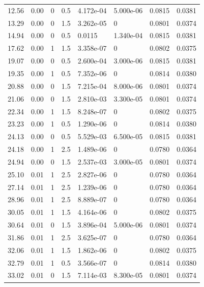 \documentclass[preview]{standalone}
\begin{document}
{{\begin{tabular}{L{1.2cm}C{1.2cm} C{0.3cm}C{0.5cm} C{1.4cm}C{1.4cm} C{1.4cm}C{1.4cm}}
  12.56  &  0.00  & 0     & 0.5 &  4.172e-04  & 5.000e-06  & 0.0815 &  0.0381   \\ 
  13.29  &  0.00  & 0     & 1.5 &  3.262e-05  & 0  & 0.0801 &  0.0374   \\ 
  14.94  &  0.00  & 0     & 0.5 &  0.0115  & 1.340e-04  & 0.0815 &  0.0381   \\ 
  17.62  &  0.00  & 1     & 1.5 &  3.358e-07  & 0  & 0.0802 &  0.0375   \\ 
  19.07  &  0.00  & 0     & 0.5 &  2.600e-04  & 3.000e-06  & 0.0815 &  0.0381   \\ 
  19.35  &  0.00  & 1     & 0.5 &  7.352e-06  & 0  & 0.0814 &  0.0380   \\ 
  20.88  &  0.00  & 0     & 1.5 &  7.215e-04  & 8.000e-06  & 0.0801 &  0.0374   \\ 
  21.06  &  0.00  & 0     & 1.5 &  2.810e-03  & 3.300e-05  & 0.0801 &  0.0374   \\ 
  22.34  &  0.00  & 1     & 1.5 &  8.248e-07  & 0  & 0.0802 &  0.0375   \\ 
  23.23  &  0.00  & 1     & 0.5 &  1.290e-06  & 0  & 0.0814 &  0.0380   \\ 
  24.13  &  0.00  & 0     & 0.5 &  5.529e-03  & 6.500e-05  & 0.0815 &  0.0381   \\ 
  24.18  &  0.00  & 1     & 2.5 &  1.489e-06  & 0  & 0.0780 &  0.0364   \\ 
  24.94  &  0.00  & 0     & 1.5 &  2.537e-03  & 3.000e-05  & 0.0801 &  0.0374   \\ 
  25.10  &  0.01  & 1     & 2.5 &  2.827e-06  & 0  & 0.0780 &  0.0364   \\ 
  27.14  &  0.01  & 1     & 2.5 &  1.239e-06  & 0  & 0.0780 &  0.0364   \\ 
  28.96  &  0.01  & 1     & 2.5 &  8.889e-07  & 0  & 0.0780 &  0.0364   \\ 
  30.05  &  0.01  & 1     & 1.5 &  4.164e-06  & 0  & 0.0802 &  0.0375   \\ 
  30.64  &  0.01  & 0     & 1.5 &  3.896e-04  & 5.000e-06  & 0.0801 &  0.0374   \\ 
  31.86  &  0.01  & 1     & 2.5 &  3.625e-07  & 0  & 0.0780 &  0.0364   \\ 
  32.06  &  0.01  & 1     & 1.5 &  1.862e-06  & 0  & 0.0802 &  0.0375   \\ 
  32.79  &  0.01  & 1     & 0.5 &  3.566e-07  & 0  & 0.0814 &  0.0380   \\ 
  33.02  &  0.01  & 0     & 1.5 &  7.114e-03  & 8.300e-05  & 0.0801 &  0.0374   \\ 

\end{tabular}}}
\end{document}
